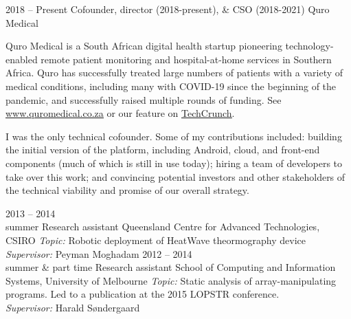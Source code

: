 \documentclass[9pt]{developercv} %
\begin{document}
\begin{entrylist}
    \entry
        {2018 -- Present}%
        {Cofounder, director (2018-present), \& CSO (2018-2021)}
        {Quro Medical}
        {Quro Medical is a South African digital health startup pioneering technology-enabled remote patient monitoring and hospital-at-home services in Southern Africa.
        Quro has successfully treated large numbers of patients with a variety of medical conditions, including many with COVID-19 since the beginning of the pandemic, and successfully raised multiple rounds of funding. See \underline{\href{https://www.quromedical.co.za}{www.quromedical.co.za}} or our feature on \underline{\href{https://techcrunch.com/2021/04/14/south-africas-quro-medical-comes-out-of-stealth-with-1-1m-to-expand-its-hospital-at-home-service/}{TechCrunch}}.

        I was the only technical cofounder.
        Some of my contributions included: building the initial version of the platform, including Android, cloud, and front-end components (much of which is still in use today); hiring a team of developers to take over this work; and convincing potential investors and other stakeholders of the technical viability and promise of our overall strategy.}
    \entry
        {2013 -- 2014\\\footnotesize{summer}}
        {Research assistant}
        {Queensland Centre for Advanced Technologies, CSIRO}
        {\textit{Topic:} Robotic deployment of HeatWave theormography device\\
        \textit{Supervisor:} Peyman Moghadam}
    \entry
        {2012 -- 2014\\\footnotesize{summer \& part time}}
        {Research assistant}
        {School of Computing and Information Systems, University of Melbourne}
        {\textit{Topic:} Static analysis of array-manipulating programs. Led to a publication at the 2015 LOPSTR conference. \\
        \textit{Supervisor:} Harald S\o ndergaard}
\end{entrylist}
\end{document}
